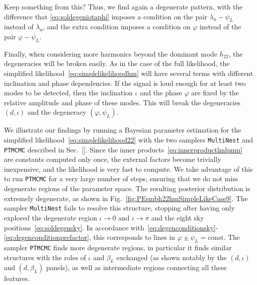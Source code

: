 \documentclass[aps,showpacs,twocolumn,prd,superscriptaddress,nofootinbib]{revtex4-1}
\newcommand{\be}{\begin{equation}}
\newcommand{\ee}{\end{equation}}
\newcommand{\bsub}{\begin{subequations}}
\newcommand{\esub}{\end{subequations}}
\newcommand\betaL{{\beta_{L}}}
\newcommand\psiL{{\psi_{L}}}
\newcommand{\jgb}[1]{{\color{DarkGreen} #1}}
\begin{document}
\jgb{Keep something from this?}
Thus, we find again a degenerate pattern, with the difference that \eqref{eq:soldegeniotaphi} imposes a condition on the pair $\lambda_{a} - \psiL$ instead of $\lambda_{a}$, and the extra condition imposes a condition on $\varphi$ instead of the pair $\varphi - \psiL$.

Finally, when considering more harmonics beyond the dominant mode $h_{22}$, the degeneracies will be broken easily. As in the case of the full likelihood, the simplified likelihood~\eqref{eq:simplelikelihoodhm} will have several terms with different inclination and phase dependencies. If the signal is loud enough for at least two modes to be detected, then the inclination $\iota$ and the phase $\varphi$ are fixed by the relative amplitude and phase of these modes. This will break the degeneracies $(d, \iota)$ and the degeneracy $(\varphi, \psiL)$.  

We illustrate our findings by running a Bayesian parameter estimation for the simplified likelihood~\eqref{eq:simplelikelihood22} with the two samplers \texttt{MultiNest} and \texttt{PTMCMC} described in Sec.~\ref{}. Since the inner products~\eqref{eq:innerproductlmlpmp} are constants computed only once, the external factors become trivially inexpensive, and the likelihood is very fast to compute. We take advantage of this to run \texttt{PTMCMC} for a very large number of steps, ensuring that we do not miss degenerate regions of the parameter space. The resulting posterior distribution is extremely degenerate, as shown in Fig.~\ref{fig:PEsmbh22hmSimpleLikeCase9}. The sampler \texttt{MultiNest} fails to resolve this structure, stopping after having only explored the degenerate region $\iota \rightarrow 0$ and $\iota \rightarrow \pi$ and the eight sky positions~\eqref{eq:soldegensky}. In accordance with~\eqref{eq:degenconditionsky}-\eqref{eq:degenconditionprefactor}, this corresponds to lines in $\varphi \pm \psiL = \mathrm{const}$. The sampler \texttt{PTMCMC} finds more degenerate regions, in particular it finds similar structures with the roles of $\iota$ and $\betaL$ exchanged (as shown notably by the $(d,\iota)$ and $(d,\betaL)$ panels), as well as intermediate regions connecting all these features. 
\end{document}
